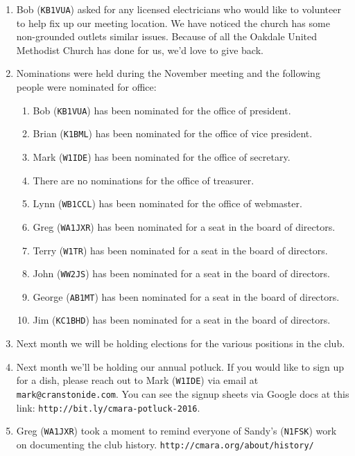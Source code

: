\documentclass[10pt,letterpaper]{article}
\begin{document}
\begin{enumerate}
\item Bob (\texttt{KB1VUA}) asked for any licensed electricians who would like to volunteer to help fix up our meeting location. We have noticed the church has some non-grounded outlets similar issues. Because of all the Oakdale United Methodist Church has done for us, we'd love to give back.
\item Nominations were held during the November meeting and the following people were nominated for office:
\begin{enumerate}
\item Bob (\texttt{KB1VUA}) has been nominated for the office of president.
\item Brian (\texttt{K1BML}) has been nominated for the office of vice president.
\item Mark (\texttt{W1IDE}) has been nominated for the office of secretary.
\item There are no nominations for the office of treasurer.
\item Lynn (\texttt{WB1CCL}) has been nominated for the office of webmaster.
\item Greg (\texttt{WA1JXR}) has been nominated for a seat in the board of directors.
\item Terry (\texttt{W1TR}) has been nominated for a seat in the board of directors.
\item John (\texttt{WW2JS}) has been nominated for a seat in the board of directors.
\item George (\texttt{AB1MT}) has been nominated for a seat in the board of directors.
\item Jim (\texttt{KC1BHD}) has been nominated for a seat in the board of directors.
\end{enumerate}
\item Next month we will be holding elections for the various positions in the club.

\item Next month we'll be holding our annual potluck. If you would like to sign up for a dish, please reach out to Mark (\texttt{W1IDE}) via email at \texttt{mark@cranstonide.com}. You can see the signup sheets via Google docs at this link: \texttt{http://bit.ly/cmara-potluck-2016}.

\item Greg (\texttt{WA1JXR}) took a moment to remind everyone of Sandy's (\texttt{N1FSK}) work on documenting the club history. \texttt{http://cmara.org/about/history/}


\end{enumerate}
\end{document}
